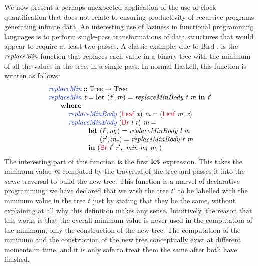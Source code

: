 We now present a perhaps unexpected application of the use of clock
quantification that does not relate to ensuring productivity of
recursive programs generating infinite data. An interesting use of
laziness in functional programming languages is to perform single-pass
transformations of data structures that would appear to require at
least two passes. A classic example, due to Bird
\cite{bird84circular}, is the $\textit{replaceMin}$ function that
replaces each value in a binary tree with the minimum of all the
values in the tree, in a single pass. In normal Haskell, this function
is written as follows:
\begin{displaymath}
  \begin{array}{l}
    \defn{replaceMin} :: \tyname{Tree} \to \tyname{Tree} \\
    \defn{replaceMin}\ \ident{t} = \kw{let}\ (\ident{t$'$}, \ident{m}) = \ident{replaceMinBody}\ \ident{t}\ \ident{m}\ \kw{in}\ \ident{t$'$} \\
    \hspace{0.6cm} \kw{where} \\
    \hspace{1cm} \defn{replaceMinBody}\ (\cons{Leaf}\ \ident{x})\ \ident{m} = (\cons{Leaf}\ \ident{m}, \ident{x}) \\
    \hspace{1cm} \defn{replaceMinBody}\ (\cons{Br}\ \ident{l}\ \ident{r})\ \ident{m} = \\
    \hspace{2cm} \kw{let}\ (\ident{l$'$}, \ident{m$_l$}) = \ident{replaceMinBody}\ \ident{l}\ \ident{m} \\
    \hspace{2cm} \textcolor{white}{\kw{let}\ }(\ident{r$'$}, \ident{m$_r$}) = \ident{replaceMinBody}\ \ident{r}\ \ident{m} \\
    \hspace{2cm} \kw{in}\ (\cons{Br}\ \ident{l$'$}\ \ident{r$'$},\ \ident{min}\ \ident{m$_l$}\ \ident{m$_r$})
  \end{array}
\end{displaymath}
The interesting part of this function is the first $\textbf{let}$
expression. This takes the minimum value $\textit{m}$ computed by the
traversal of the tree and passes it into the \emph{same} traversal to
build the new tree. This function is a marvel of declarative
programming: we have declared that we wish the tree $t'$ to be
labelled with the minimum value in the tree $t$ just by stating that
they be the same, without explaining at all why this definition makes
any sense. Intuitively, the reason that this works is that the overall
minimum value is never used in the computation of the minimum, only
the construction of the new tree. The computation of the minimum and
the construction of the new tree conceptually exist at different
moments in time, and it is only safe to treat them the same after both
have finished.

